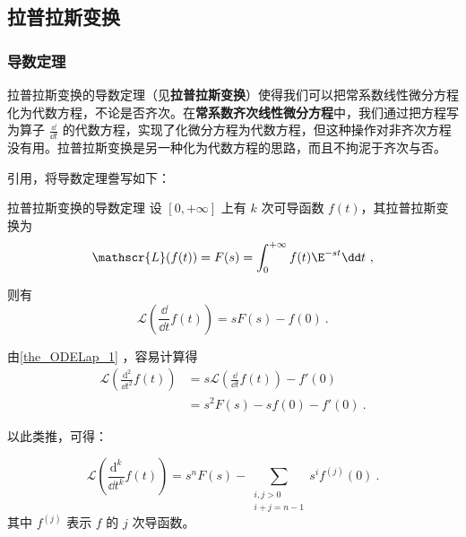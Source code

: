

\subsection{拉普拉斯变换}

\subsubsection{导数定理}

拉普拉斯变换的导数定理（见\textbf{拉普拉斯变换}）使得我们可以把常系数线性微分方程化为代数方程，不论是否齐次。在\textbf{常系数齐次线性微分方程}中，我们通过把方程写为算子 $\frac{\dd }{\dd t}$ 的代数方程，实现了化微分方程为代数方程，但这种操作对非齐次方程没有用。拉普拉斯变换是另一种化为代数方程的思路，而且不拘泥于齐次与否。

引用，将导数定理誊写如下：
\begin{theorem}{拉普拉斯变换的导数定理}\label{the_ODELap_1}
设 $[0, +\infty]$ 上有 $k$ 次可导函数 $f(t)$，其拉普拉斯变换为
\begin{equation}
\mathscr{L}(f(t))=F(s)=\int^{+\infty}_0f(t)\E^{-st}\dd t~,
\end{equation}

则有
\begin{equation}
\mathscr{L}(\frac{\dd}{\dd t}f(t))=sF(s)-f(0)~.
\end{equation}
\end{theorem}

由\autoref{the_ODELap_1} ，容易计算得
\begin{equation}
\begin{aligned}
\mathscr{L}(\frac{\mathrm{d}^2}{\dd t^2}f(t))&=s\mathscr{L}(\frac{\dd}{\dd t}f(t))-f'(0)\\
&=s^2F(s)-sf(0)-f'(0)~.
\end{aligned}
\end{equation}

以此类推，可得：

\begin{corollary}{}\label{cor_ODELap_1}
\begin{equation}
\mathscr{L}(\frac{\mathrm{d}^k}{\dd t^k}f(t))=s^nF(s)-\sum_{\substack{i, j>0\\   i+j=n-1}}s^if^{(j)}(0)~.
\end{equation}
其中 $f^{(j)}$ 表示 $f$ 的 $j$ 次导函数。



\end{corollary}





